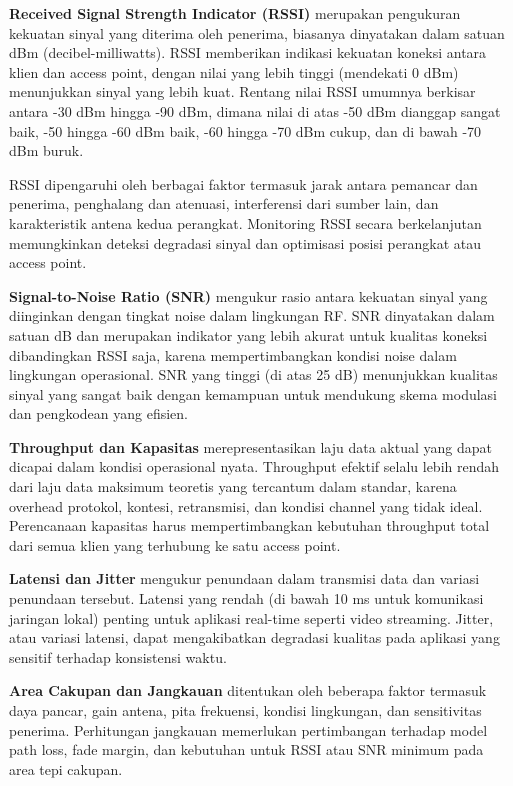 \textbf{Received Signal Strength Indicator (RSSI)} merupakan pengukuran kekuatan sinyal yang diterima oleh penerima, biasanya dinyatakan dalam satuan dBm (decibel-milliwatts). RSSI memberikan indikasi kekuatan koneksi antara klien dan access point, dengan nilai yang lebih tinggi (mendekati 0 dBm) menunjukkan sinyal yang lebih kuat. Rentang nilai RSSI umumnya berkisar antara -30 dBm hingga -90 dBm, dimana nilai di atas -50 dBm dianggap sangat baik, -50 hingga -60 dBm baik, -60 hingga -70 dBm cukup, dan di bawah -70 dBm buruk.

RSSI dipengaruhi oleh berbagai faktor termasuk jarak antara pemancar dan penerima, penghalang dan atenuasi, interferensi dari sumber lain, dan karakteristik antena kedua perangkat. Monitoring RSSI secara berkelanjutan memungkinkan deteksi degradasi sinyal dan optimisasi posisi perangkat atau access point.

\textbf{Signal-to-Noise Ratio (SNR)} mengukur rasio antara kekuatan sinyal yang diinginkan dengan tingkat noise dalam lingkungan RF. SNR dinyatakan dalam satuan dB dan merupakan indikator yang lebih akurat untuk kualitas koneksi dibandingkan RSSI saja, karena mempertimbangkan kondisi noise dalam lingkungan operasional. SNR yang tinggi (di atas 25 dB) menunjukkan kualitas sinyal yang sangat baik dengan kemampuan untuk mendukung skema modulasi dan pengkodean yang efisien.

\textbf{Throughput dan Kapasitas} merepresentasikan laju data aktual yang dapat dicapai dalam kondisi operasional nyata. Throughput efektif selalu lebih rendah dari laju data maksimum teoretis yang tercantum dalam standar, karena overhead protokol, kontesi, retransmisi, dan kondisi channel yang tidak ideal. Perencanaan kapasitas harus mempertimbangkan kebutuhan throughput total dari semua klien yang terhubung ke satu access point.

\textbf{Latensi dan Jitter} mengukur penundaan dalam transmisi data dan variasi penundaan tersebut. Latensi yang rendah (di bawah 10 ms untuk komunikasi jaringan lokal) penting untuk aplikasi real-time seperti video streaming. Jitter, atau variasi latensi, dapat mengakibatkan degradasi kualitas pada aplikasi yang sensitif terhadap konsistensi waktu.

\textbf{Area Cakupan dan Jangkauan} ditentukan oleh beberapa faktor termasuk daya pancar, gain antena, pita frekuensi, kondisi lingkungan, dan sensitivitas penerima. Perhitungan jangkauan memerlukan pertimbangan terhadap model path loss, fade margin, dan kebutuhan untuk RSSI atau SNR minimum pada area tepi cakupan.

